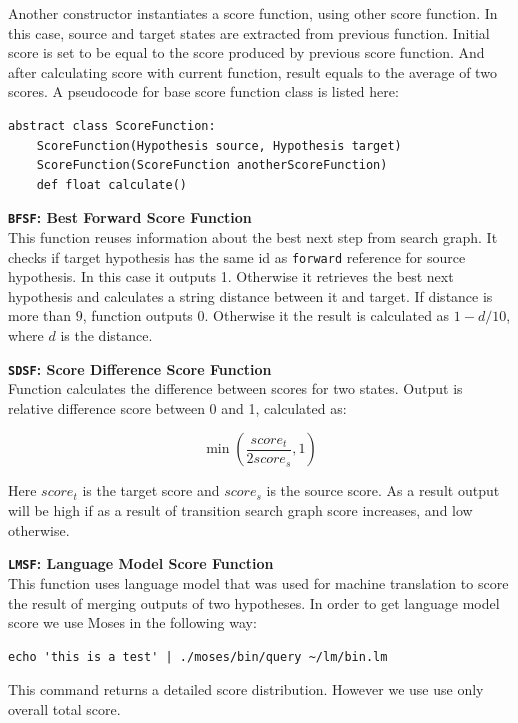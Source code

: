 Another constructor instantiates a score function, using other score function. In this case, source and target states are extracted from previous function. Initial score is set to be equal to the score produced by previous score function. And after calculating score with current function, result equals to the average of two scores. A pseudocode for base score function class is listed here:

\begin{verbatim}
abstract class ScoreFunction:
    ScoreFunction(Hypothesis source, Hypothesis target)
    ScoreFunction(ScoreFunction anotherScoreFunction)
    def float calculate()
\end{verbatim}


\begin{flushleft}

\textbf{\texttt{BFSF}: \textbf{Best Forward Score Function}} \\
This function reuses information about the best next step from search graph. It checks if target hypothesis has the same id as \texttt{forward} reference for source hypothesis. In this case it outputs 1. Otherwise it retrieves the best next hypothesis and calculates a string distance between it and target. If distance is more than $9$, function outputs 0. Otherwise it the result is calculated as $1-d/10$, where $d$ is the distance. \\
\bigskip

\textbf{\texttt{SDSF}: \textbf{Score Difference Score Function}} \\
Function calculates the difference between scores for two states. Output is relative difference score between 0 and 1, calculated as:
\begin{large}
\begin{equation}
\min(\frac{score_{t}}{2 score_{s}}, 1)
\end{equation}
\end{large}
Here $score_{t}$ is the target score and $score_{s}$ is the source score. As a result output will be high if as a result of transition search graph score increases, and low otherwise.
\bigskip


\textbf{\texttt{LMSF}: \textbf{Language Model Score Function}} \\
This function uses language model that was used for machine translation to score the result of merging outputs of two hypotheses. In order to get language model score we use Moses in the following way:

\begin{verbatim}
echo 'this is a test' | ./moses/bin/query ~/lm/bin.lm
\end{verbatim}

This command returns a detailed score distribution. However we use use only overall total score.
\bigskip

\end{flushleft}


